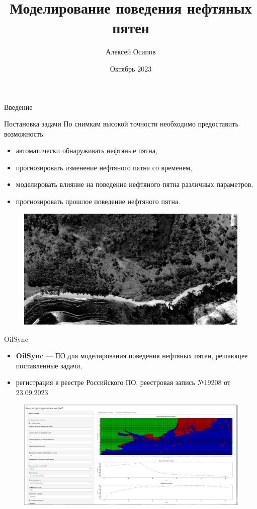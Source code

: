 \documentclass{beamer}
\title{Моделирование поведения нефтяных пятен}
\author{
	Алексей Осипов\inst{1, 2}
}
\institute{
	\inst{1}
	Синкретис
	\inst{2}
	Тинькофф
}
\date{Октябрь 2023}
\begin{document}
\begin{frame}
\titlepage
\end{frame}	
\begin{section}{Введение}
\begin{frame}{Постановка задачи}
По снимкам высокой точности необходимо предоставить возможность:
\begin{itemize}
	\item автоматически обнаруживать нефтяные пятна,
	\item прогнозировать изменение нефтяного пятна со временем,
	\item моделировать влияние на поведение нефтяного пятна различных параметров,
	\item прогнозировать прошлое поведение нефтяного пятна.
\end{itemize}

\begin{figure}[H]
	\centering
	\includegraphics[scale=0.1]{maxar_8thAugust_1_21_45.png}
\end{figure}
\end{frame}
\begin{frame}{OilSync}
\begin{itemize}
	\item \textbf{OilSync} --- ПО для моделирования поведения нефтяных пятен, решающее поставленные задачи,
	\item регистрация в реестре Российского ПО, реестровая запись №19208 от 23.09.2023
\end{itemize}

\begin{figure}[H]
	\centering
	\includegraphics[scale=0.2]{how_oil_spreads.png}
\end{figure}
\end{frame}


\end{section}
\end{document}
